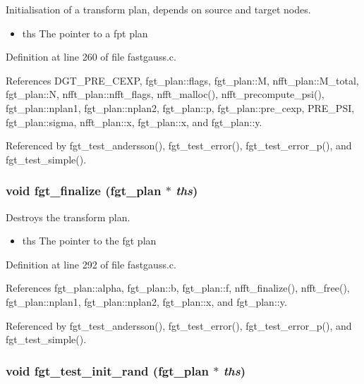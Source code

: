 Initialisation of a transform plan, depends on source and target nodes. 

\begin{itemize}
\item ths The pointer to a fpt plan 
\end{itemize}


Definition at line 260 of file fastgauss.c.

References DGT\_\-PRE\_\-CEXP, fgt\_\-plan::flags, fgt\_\-plan::M, nfft\_\-plan::M\_\-total, fgt\_\-plan::N, nfft\_\-plan::nfft\_\-flags, nfft\_\-malloc(), nfft\_\-precompute\_\-psi(), fgt\_\-plan::nplan1, fgt\_\-plan::nplan2, fgt\_\-plan::p, fgt\_\-plan::pre\_\-cexp, PRE\_\-PSI, fgt\_\-plan::sigma, nfft\_\-plan::x, fgt\_\-plan::x, and fgt\_\-plan::y.

Referenced by fgt\_\-test\_\-andersson(), fgt\_\-test\_\-error(), fgt\_\-test\_\-error\_\-p(), and fgt\_\-test\_\-simple().\hypertarget{group__applications__fastgauss_g4634fe28b9e1be61106871cf0e61ef83}{
\subsubsection{\setlength{\rightskip}{0pt plus 5cm}void fgt\_\-finalize ({\bf fgt\_\-plan} $\ast$ {\em ths})}}
\label{group__applications__fastgauss_g4634fe28b9e1be61106871cf0e61ef83}


Destroys the transform plan. 

\begin{itemize}
\item ths The pointer to the fgt plan 
\end{itemize}


Definition at line 292 of file fastgauss.c.

References fgt\_\-plan::alpha, fgt\_\-plan::b, fgt\_\-plan::f, nfft\_\-finalize(), nfft\_\-free(), fgt\_\-plan::nplan1, fgt\_\-plan::nplan2, fgt\_\-plan::x, and fgt\_\-plan::y.

Referenced by fgt\_\-test\_\-andersson(), fgt\_\-test\_\-error(), fgt\_\-test\_\-error\_\-p(), and fgt\_\-test\_\-simple().\hypertarget{group__applications__fastgauss_g317a464dbf2df948bb94ef5748710e57}{
\subsubsection{\setlength{\rightskip}{0pt plus 5cm}void fgt\_\-test\_\-init\_\-rand ({\bf fgt\_\-plan} $\ast$ {\em ths})}}
\label{group__applications__fastgauss_g317a464dbf2df948bb94ef5748710e57}


